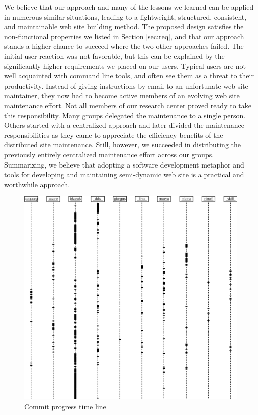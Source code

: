 \documentclass[10pt]{article}
\begin{document}
We believe that our approach and many of the lessons we learned
can be applied in numerous similar situations,
leading to a lightweight, structured, consistent, and maintainable
web site building method. The proposed design satisfies the non-functional properties
we listed in Section \ref{sec:req},
and that our approach stands a higher chance to succeed where the
two other approaches failed.
The initial user reaction was not favorable, but this can
be explained by the significantly higher requirements we
placed on our users. Typical users are not well acquainted
with command line tools, and often see them as a threat to their productivity.
Instead of giving instructions by email to an unfortunate
web site maintainer, they now had to become active members
of an evolving web site maintenance effort.
Not all members of our research center proved ready to take
this responsibility.
Many groups delegated the maintenance to a single person. 
Others started with a centralized approach and later divided the
maintenance responsibilities as they came to appreciate the efficiency
benefits of the distributed site maintenance.
Still, however, we succeeded in distributing the previously
entirely centralized maintenance effort across our groups.
Summarizing, we believe that adopting a software development
metaphor and tools for developing and maintaining semi-dynamic
web site is a practical and worthwhile approach.

\begin{figure}[h!]
\includegraphics[scale=0.6]{cvs-log.eps}
\caption{Commit progress time line}
\label{fig:cvs-log}
\end{figure}
\end{document}
